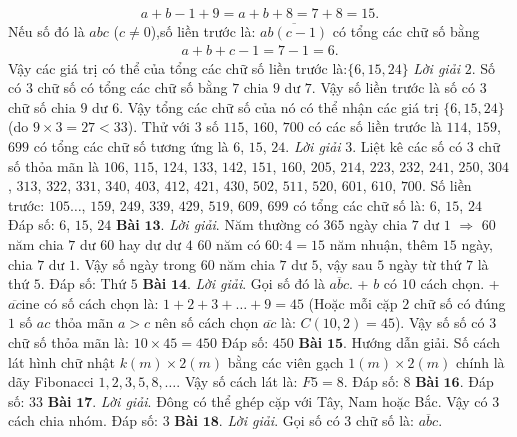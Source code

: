 \begin{multicols}{2}
\begin{align*}
			a+b-1+9=a+b+8=7+8=15.
		\end{align*}
	Nếu số đó là $abc$ ($c\ne0$),số liền trước là: $\overline{ab(c-1)}$ có tổng các chữ số bằng
	\begin{align*}
			a+b+c-1=7-1=6.
		\end{align*}
	Vậy các giá trị có thể của tổng các chữ số liền trước là:$\{6,15,24\}$
	\vskip 0.1cm 
	\textit{Lời giải} $2$.
	Số có $3$ chữ số có tổng các chữ số bằng $7$ chia $9$ dư $7$. Vậy số liền trước là số có $3$ chữ số chia $9$ dư $6$. Vậy tổng các chữ số của nó có thể nhận các giá trị $\{6,15,24\}$ (do $9\times 3 = 27 < 33$). Thử với $3$ số $115$, $160$, $700$ có các số liền trước là $114$, $159$, $699$ có tổng các chữ số tương ứng là $6$, $15$, $24$.
	\vskip 0.1cm
	\textit{Lời giải} $3$. Liệt kê các số có $3$ chữ số thỏa mãn là $106$, $115$, $124$, $133$, $142$, $151$, $160$, $205$, $214$, $223$, $232$, $241$, $250$, $304$, $313$, $322$, $331$, $340$, $403$, $412$, $421$, $430$, $502$, $511$, $520$, $601$, $610$, $700$.
	\vskip 0.1cm
	Số liền trước: $105\ldots$, $159$, $249$, $339$, $429$, $519$, $609$, $699$ có tổng các chữ số là: $6$, $15$, $24$
	\vskip 0.1cm
	Đáp số: $6$, $15$, $24$
	\vskip 0.1cm
	\textbf{\color{cackithi}Bài} $\pmb{13.}$ \textit{Lời giải}.
	Năm thường có $365$ ngày chia $7$ dư $1$ $\Rightarrow$ $60$ năm chia $7$ dư $60$ hay dư dư $4$
	\vskip 0.1cm
	$60$ năm có $60:4=15$ năm nhuận, thêm $15$ ngày, chia $7$ dư $1$.
	\vskip 0.1cm
	Vậy số ngày trong $60$ năm chia $7$ dư $5$, vậy sau $5$ ngày từ thứ $7$ là thứ $5$.
	\vskip 0.1cm
	Đáp số: Thứ $5$
	\vskip 0.1cm
	\textbf{\color{cackithi}Bài} $\pmb{14.}$ \textit{Lời giải}.
	Gọi số đó là $\overline{abc}$.
	\vskip 0.1cm
	+ $b$ có $1$0 cách chọn.
	\vskip 0.1cm
	+ $\overline{ac}$ine có số cách chọn là: $1+2+3+\ldots+9 = 45$ (Hoặc mỗi cặp $2$ chữ số có đúng $1$ số $ac$ thỏa mãn $a>c$ nên số cách chọn $\overline{ac}$ là: $C(10,2) = 45$).
	\vskip 0.1cm
	Vậy số số có $3$ chữ số thỏa mãn là: $10\times45=450$
	\vskip 0.1cm
	Đáp số: $450$ 
	\vskip 0.1cm
	\textbf{\color{cackithi}Bài} $\pmb{15.}$ Hướng dẫn giải.
	Số cách lát hình chữ nhật $k(m) \times 2(m)$ bằng các viên gạch $1(m)\times2(m)$ chính là dãy Fibonacci $1,2,3,5,8,\ldots$. Vậy số cách lát là: $F5 = 8$.
	\vskip 0.1cm
	Đáp số: $8$
	\vskip 0.1cm
	\textbf{\color{cackithi}Bài} $\pmb{16.}$ Đáp số: $33$
	\vskip 0.1cm 
	\textbf{\color{cackithi}Bài} $\pmb{17.}$ \textit{Lời giải}. Đông có thể ghép cặp với Tây, Nam hoặc Bắc. Vậy có $3$ cách chia nhóm.
	\vskip 0.1cm
	Đáp số: $3$
	\vskip 0.1cm
	\textbf{\color{cackithi}Bài} $\pmb{18.}$ \textit{Lời giải}.
	Gọi số có $3$ chữ số là: $\overline{abc}$.

\end{multicols}
